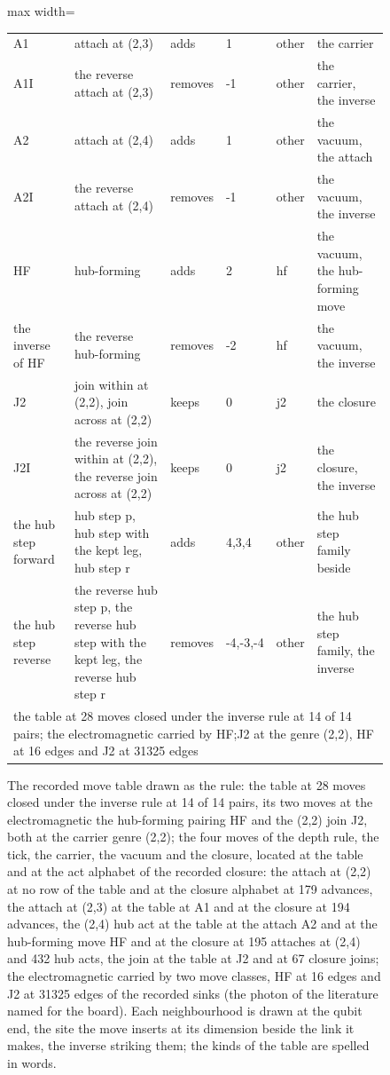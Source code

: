 \begin{figure}[htbp]
{\begin{adjustbox}{max width=\linewidth}
\begin{tabular}{llllll}
A1 & attach at (2,3) & adds & 1 & other & the carrier \\
A1I & the reverse attach at (2,3) & removes & -1 & other & the carrier, the inverse \\
A2 & attach at (2,4) & adds & 1 & other & the vacuum, the attach \\
A2I & the reverse attach at (2,4) & removes & -1 & other & the vacuum, the inverse \\
HF & hub-forming & adds & 2 & hf & the vacuum, the hub-forming move \\
the inverse of HF & the reverse hub-forming & removes & -2 & hf & the vacuum, the inverse \\
J2 & join within at (2,2), join across at (2,2) & keeps & 0 & j2 & the closure \\
J2I & the reverse join within at (2,2), the reverse join across at (2,2) & keeps & 0 & j2 & the closure, the inverse \\
the hub step forward & hub step p, hub step with the kept leg, hub step r & adds & 4,3,4 & other & the hub step family beside \\
the hub step reverse & the reverse hub step p, the reverse hub step with the kept leg, the reverse hub step r & removes & -4,-3,-4 & other & the hub step family, the inverse \\
\hline
\multicolumn{6}{l}{the table at 28 moves closed under the inverse rule at 14 of 14 pairs; the electromagnetic carried by HF;J2 at the genre (2,2), HF at 16 edges and J2 at 31325 edges} \\
\end{tabular}\end{adjustbox}}
\caption{The recorded move table drawn as the rule: the table at 28 moves closed under the inverse rule at 14 of 14 pairs, its two moves at the electromagnetic the hub-forming pairing HF and the (2,2) join J2, both at the carrier genre (2,2); the four moves of the depth rule, the tick, the carrier, the vacuum and the closure, located at the table and at the act alphabet of the recorded closure: the attach at (2,2) at no row of the table and at the closure alphabet at 179 advances, the attach at (2,3) at the table at A1 and at the closure at 194 advances, the (2,4) hub act at the table at the attach A2 and at the hub-forming move HF and at the closure at 195 attaches at (2,4) and 432 hub acts, the join at the table at J2 and at 67 closure joins; the electromagnetic carried by two move classes, HF at 16 edges and J2 at 31325 edges of the recorded sinks (the photon of the literature named for the board). Each neighbourhood is drawn at the qubit end, the site the move inserts at its dimension beside the link it makes, the inverse striking them; the kinds of the table are spelled in words.}\label{fig:X-4-D543100-move-rule}
\end{figure}
